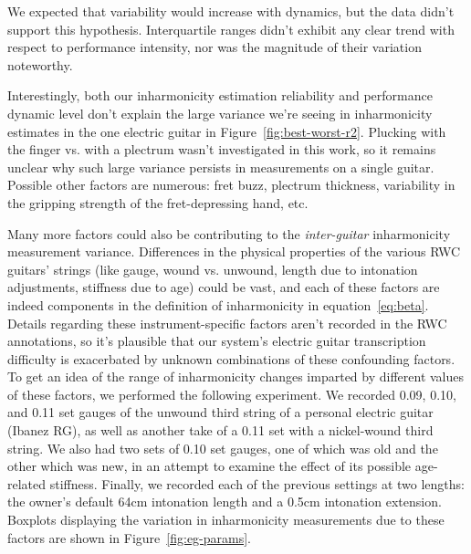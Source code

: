 \documentclass[12pt]{cmuthesis}
\begin{document}
We expected that variability would increase with dynamics, but the data didn't support this hypothesis. Interquartile ranges didn't exhibit any clear trend with respect to performance intensity, nor was the magnitude of their variation noteworthy. 

Interestingly, both our inharmonicity estimation reliability and performance dynamic level don't explain the large variance we're seeing in inharmonicity estimates in the one electric guitar in Figure~\ref{fig:best-worst-r2}. Plucking with the finger vs. with a plectrum wasn't investigated in this work, so it remains unclear why such large variance persists in measurements on a single guitar. Possible other factors are numerous: fret buzz, plectrum thickness, variability in the gripping strength of the fret-depressing hand, etc.

Many more factors could also be contributing to the \textit{inter-guitar} inharmonicity measurement variance. Differences in the physical properties of the various RWC guitars' strings (like gauge, wound vs. unwound, length due to intonation adjustments, stiffness due to age) could be vast, and each of these factors are indeed components in the definition of inharmonicity in equation~\eqref{eq:beta}. Details regarding these instrument-specific factors aren't recorded in the RWC annotations, so it's plausible that our system's electric guitar transcription difficulty is exacerbated by unknown combinations of these confounding factors. To get an idea of the range of inharmonicity changes imparted by different values of these factors, we performed the following experiment. We recorded 0.09, 0.10, and 0.11 set gauges of the unwound third string of a personal electric guitar (Ibanez RG), as well as another take of a 0.11 set with a nickel-wound third string. We also had two sets of 0.10 set gauges, one of which was old and the other which was new, in an attempt to examine the effect of its possible age-related stiffness. Finally, we recorded each of the previous settings at two lengths: the owner's default 64cm intonation length and a 0.5cm intonation extension. Boxplots displaying the variation in inharmonicity measurements due to these factors are shown in Figure~\ref{fig:eg-params}.
\end{document}
